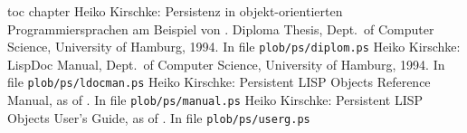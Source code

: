 %
\newcommand{\etal}{et al.\ }
\newcommand{\infile}[1]{In file \texttt{#1}}
%
\begin{thebibliography}{XXXXXXXXXXXX}
\addcontentsline%
 {toc}%
 {chapter}%
 {\protect\numberline{}{\protect\bibname}}%
%
Heiko Kirschke:
Persistenz in objekt-orientierten Programmiersprachen am Beispiel von
\clos.
Diploma Thesis,
Dept.\ of Computer Science, University of Hamburg,
1994. \infile{plob/\lb{}ps/\lb{}diplom.ps}
%
Heiko Kirschke:
LispDoc Manual,
Dept.\ of Computer Science, University of Hamburg,
1994. \infile{plob/\lb{}ps/\lb{}ldocman.ps}
%
Heiko Kirschke:
Persistent LISP Objects Reference Manual,
as of \protect\mandate.
\infile{plob/\lb{}ps/\lb{}manual.ps}
%
Heiko Kirschke:
Persistent LISP Objects User's Guide,
as of \protect\mandate.
\infile{plob/\lb{}ps/\lb{}userg.ps}
%
\end{thebibliography}

